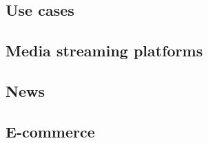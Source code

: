 \subsection{Use cases}\label{sec:usecases} %

\subsection{Media streaming platforms} %

\subsection{News} %

\subsection{E-commerce} %